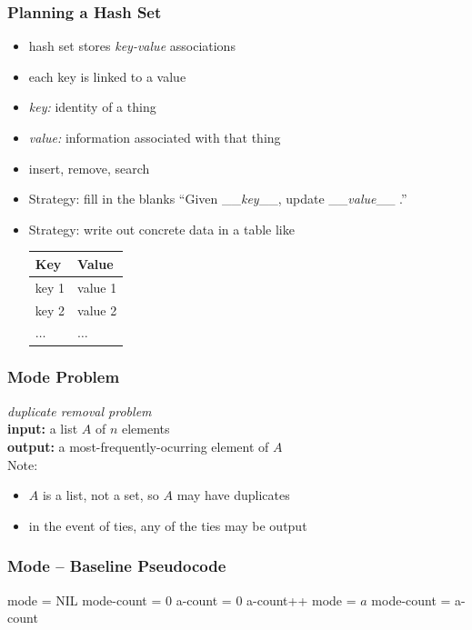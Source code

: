 \documentclass[10pt]{beamer}
\begin{document}
\begin{frame} \frametitle{Planning a Hash Set}
\begin{itemize}
  \item hash set stores \emph{key-value} associations
  \item each key is linked to a value
  \item \emph{key:} identity of a thing
  \item \emph{value:} information associated with that thing
  \item insert, remove, search
  \item Strategy: fill in the blanks ``Given \_\_\emph{key}\_\_, update \_\_\emph{value}\_\_ .''
  \item Strategy: write out concrete data in a table like
  \begin{center}
    \begin{tabular}{ll}
      \textbf{Key} & \textbf{Value} \\ \hline
      key 1 & value 1 \\
      key 2 & value 2 \\
      $\ldots$ & $\ldots$ 
    \end{tabular}
  \end{center}
\end{itemize}
\end{frame}


\begin{frame} \frametitle{Mode Problem}
  \emph{duplicate removal problem} \\
  \textbf{input:} a list $A$ of $n$ elements\\
  \textbf{output:} a most-frequently-ocurring element of $A$ \\

  \vspace{24pt}
  Note:
  \begin{itemize}
    \item $A$ is a list, not a set, so $A$ may have duplicates
    \item in the event of ties, any of the ties may be output
  \end{itemize}
\end{frame}


\begin{frame} \frametitle{Mode -- Baseline Pseudocode}
  {\footnotesize
  \begin{algorithmic}[1]
    \State mode = NIL
    \State mode-count = 0
      \State a-count = 0
          \State a-count++
        \EndIf
      \EndFor
        \State mode = $a$
        \State mode-count = a-count
      \EndIf
    \EndFor
    \State {}
    \EndFunction
  \end{algorithmic}
  }
\end{frame}
\end{document}

